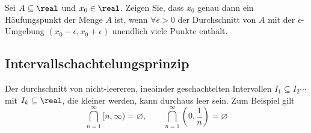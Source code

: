 \begin{ex}
  Sei $A \subseteq \real$ und $x_0 \in \real$. Zeigen Sie, dass $x_0$ genau dann ein Häufungspunkt der Menge $A$ ist, wenn $\forall \epsilon > 0$ der Durchschnitt von $A$ mit der $\epsilon$-Umgebung $(x_0 - \epsilon, x_0 + \epsilon)$ unendlich viele Punkte enthält.
\end{ex}

\subsection{Intervallschachtelungsprinzip}

Der durchschnitt von nicht-leereren, ineainder geschachtelten Intervallen $I_1 \subseteq I_2 \cdots $ mit $I_k \subseteq \real$, die kleiner werden, kann durchaus leer sein. Zum Beispiel gilt
\[
  \bigcap_{n=1}^{\infty} [n, \infty) = \varnothing,
  \qquad
  \bigcap_{n=1}^{\infty} \left(0, \frac{1}{n}\right) = \varnothing
\]

